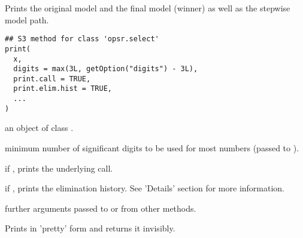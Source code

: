 
%
\begin{Description}
Prints the original model and the final model (winner) as well as the
stepwise model path.
\end{Description}
%
\begin{Usage}
\begin{verbatim}
## S3 method for class 'opsr.select'
print(
  x,
  digits = max(3L, getOption("digits") - 3L),
  print.call = TRUE,
  print.elim.hist = TRUE,
  ...
)
\end{verbatim}
\end{Usage}
%
\begin{Arguments}
\begin{ldescription}
\item[\code{x}] an object of class .

\item[\code{digits}] minimum number of significant digits to be used for most numbers (passed to ).

\item[\code{print.call}] if , prints the underlying  call.

\item[\code{print.elim.hist}] if , prints the elimination history. See
'Details' section for more information.

\item[\code{...}] further arguments passed to or from other methods.
\end{ldescription}
\end{Arguments}
%
\begin{Value}
Prints  in 'pretty' form and returns it invisibly.
\end{Value}


